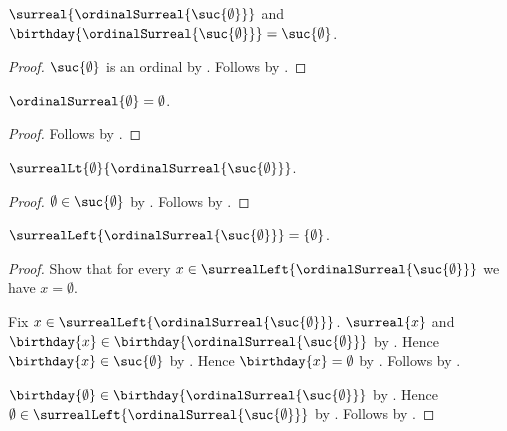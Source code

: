 \begin{proposition}\label{surreal_one_is_surreal}
    $\surreal{\ordinalSurreal{\suc{\emptyset}}}$ and
        $\birthday{\ordinalSurreal{\suc{\emptyset}}}=\suc{\emptyset}$.
\end{proposition}
\begin{proof}
    $\suc{\emptyset}$ is an ordinal
        by .
    Follows by
        .
\end{proof}

\begin{proposition}\label{empty_ordinal_surreal}
    $\ordinalSurreal{\emptyset}=\emptyset$.
\end{proposition}
\begin{proof}
    Follows by .
\end{proof}

\begin{proposition}\label{surreal_zero_lt_one}
    $\surrealLt{\emptyset}{\ordinalSurreal{\suc{\emptyset}}}$.
\end{proposition}
\begin{proof}
    $\emptyset\in\suc{\emptyset}$ by .
    Follows by
        .
\end{proof}

\begin{proposition}\label{surreal_one_left}
    $\surrealLeft{\ordinalSurreal{\suc{\emptyset}}}=\{\emptyset\}$.
\end{proposition}
\begin{proof}
    Show that for every
        $x\in\surrealLeft{\ordinalSurreal{\suc{\emptyset}}}$ we have
        $x=\emptyset$.
    \begin{subproof}
        Fix $x\in\surrealLeft{\ordinalSurreal{\suc{\emptyset}}}$.
        $\surreal{x}$ and
            $\birthday{x}\in
                \birthday{\ordinalSurreal{\suc{\emptyset}}}$
            by .
        Hence $\birthday{x}\in\suc{\emptyset}$
            by .
        Hence $\birthday{x}=\emptyset$ by .
        Follows by .
    \end{subproof}
    $\birthday{\emptyset}\in
        \birthday{\ordinalSurreal{\suc{\emptyset}}}$
        by .
    Hence $\emptyset\in
        \surrealLeft{\ordinalSurreal{\suc{\emptyset}}}$
        by
        .
    Follows by .
\end{proof}

